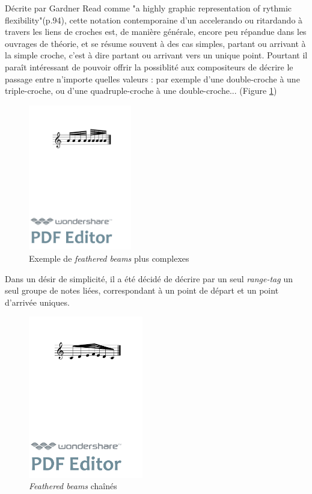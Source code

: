 \documentclass{article}
\newenvironment{gmncode}	{\vspace{-2mm}\small\verbatim}{\endverbatim\vspace{-2mm}}
\begin{document}
Décrite par Gardner Read \cite{read1969music} comme "a highly graphic representation of rythmic flexibility"(p.94), cette notation contemporaine d'un accelerando ou ritardando à travers les liens de croches est, de manière générale, encore peu répandue dans les ouvrages de théorie, et se résume souvent à des cas simples, partant ou arrivant à la simple croche, c'est à dire partant ou arrivant vers un unique point. Pourtant il paraît intéressant de pouvoir offrir la possiblité aux compositeurs de décrire le passage entre n'importe quelles valeurs : par exemple d'une double-croche à une triple-croche, ou d'une quadruple-croche à une double-croche... (Figure \ref{fig:fbeamcomplex})

\begin{figure}[h]
\centering
\includegraphics[width=45mm]{img/fbeamcomplex.pdf}
\caption{Exemple de \emph{feathered beams} plus complexes}
\label{fig:fbeamcomplex}
\end{figure}

Dans un désir de simplicité, il a été décidé de décrire par un seul \emph{range-tag} un seul groupe de notes liées, correspondant à un point de départ et un point d'arrivée uniques.

\begin{figure}[h]
\centering
\begin{gmncode}
[ 
  \fBeamBegin:1 
  c/8 d e/16 
  \fBeamBegin:2 f/32 \fBeamEnd:1 
  e/16 d/8 c
  \fBeamEnd:2 
]
\end{gmncode}
\includegraphics[width=5cm]{img/fBeamChaine.pdf}
\caption{\emph{Feathered beams} chaînés}
\label{fig:fbeamchain}
\end{figure}
\end{document}
